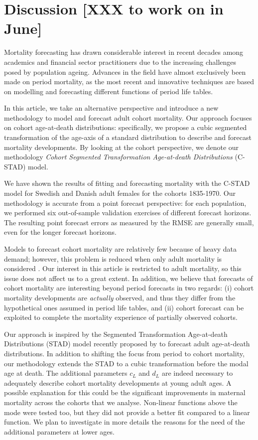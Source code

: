\documentclass[11pt, a4paper]{article}
\begin{document}
\section{Discussion [XXX to work on in June]} 
\label{Sec:Discussion}
Mortality forecasting has drawn considerable interest in recent decades among academics and financial sector practitioners due to the increasing challenges posed by population ageing. Advances in the field have almost exclusively been made on period mortality, as the most recent and innovative techniques are based on modelling and forecasting different functions of period life tables. \par   
In this article, we take an alternative perspective and introduce a new methodology to model and forecast adult cohort mortality. Our approach focuses on cohort age-at-death distributions: specifically, we propose a cubic segmented transformation of the age-axis of a standard distribution to describe and forecast mortality developments. By looking at the cohort perspective, we denote our methodology \emph{Cohort Segmented Transformation Age-at-death Distributions} (C-STAD) model. \par 
We have shown the results of fitting and forecasting mortality with the C-STAD model for Swedish and Danish adult females for the cohorts 1835-1970. Our methodology is accurate from a point forecast perspective: for each population, we performed six out-of-sample validation exercises of different forecast horizons. The resulting point forecast errors as measured by the RMSE are generally small, even for the longer forecast horizons. \par
Models to forecast cohort mortality are relatively few because of heavy data demand; however, this problem is reduced when only adult mortality is considered \citep{booth2006demographic}. Our interest in this article is restricted to adult mortality, so this issue does not affect us to a great extent. In addition, we believe that forecasts of cohort mortality are interesting beyond period forecasts in two regards: (i) cohort mortality developments are \textit{actually} observed, and thus they differ from the hypothetical ones assumed in period life tables, and (ii) cohort forecast can be exploited to complete the mortality experience of partially observed cohorts. \par 
Our approach is inspired by the Segmented Transformation Age-at-death Distributions (STAD) model recently proposed by \cite{basellini2019modeling} to forecast adult age-at-death distributions. In addition to shifting the focus from period to cohort mortality, our methodology extends the STAD to a cubic transformation before the modal age at death. The additional parameters $c_L$ and $d_L$ are indeed necessary to adequately describe cohort mortality developments at young adult ages. A possible explanation for this could be the significant improvements in maternal mortality across the cohorts that we analyse. Non-linear functions above the mode were tested too, but they did not provide a better fit compared to a linear function. We plan to investigate in more details the reasons for the need of the additional parameters at lower ages. \par
\end{document}
